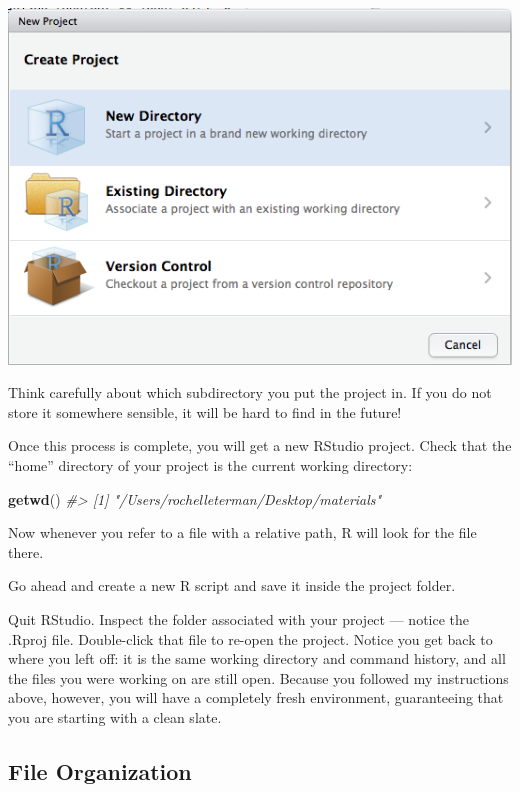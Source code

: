\documentclass[
]{book}
\newenvironment{Shaded}{\begin{snugshade}}{\end{snugshade}}
\newcommand{\CommentTok}[1]{\textcolor[rgb]{0.56,0.35,0.01}{\textit{#1}}}
\newcommand{\KeywordTok}[1]{\textcolor[rgb]{0.13,0.29,0.53}{\textbf{#1}}}
\newcommand{\NormalTok}[1]{#1}
\begin{document}
\begin{center}\includegraphics[width=0.7\linewidth]{img/rstudio-project-1} \end{center}

Think carefully about which subdirectory you put the project in. If you do not store it somewhere sensible, it will be hard to find in the future!

Once this process is complete, you will get a new RStudio project. Check that the ``home'' directory of your project is the current working directory:

\begin{Shaded}
\begin{Highlighting}[]
\KeywordTok{getwd}\NormalTok{()}
\CommentTok{#> [1] "/Users/rochelleterman/Desktop/materials"}
\end{Highlighting}
\end{Shaded}

Now whenever you refer to a file with a relative path, R will look for the file there.

Go ahead and create a new R script and save it inside the project folder.

Quit RStudio. Inspect the folder associated with your project --- notice the .Rproj file. Double-click that file to re-open the project. Notice you get back to where you left off: it is the same working directory and command history, and all the files you were working on are still open. Because you followed my instructions above, however, you will have a completely fresh environment, guaranteeing that you are starting with a clean slate.

\hypertarget{file-organization}{%
\subsection{File Organization}\label{file-organization}}
\end{document}
